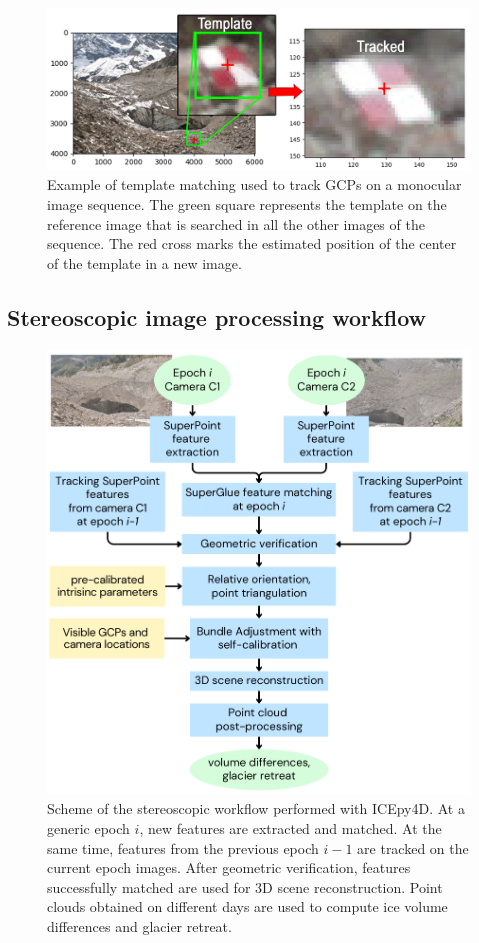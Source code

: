 \begin{figure}
    \centering
    \includegraphics[width=1\textwidth]{tracking_gcp.png}
    \caption{Example of template matching used to track GCPs on a
        monocular image sequence. The green square represents the
        template on the reference image that is searched in all the other
        images of the sequence.
        The red cross marks the estimated position of the center of the
        template in a new
        image.}
    \label{fig:4:templatematch}
\end{figure}

\subsection{Stereoscopic image processing workflow}\label{sec:4:stereoworkflow}

\begin{figure}
  \centering
  \includegraphics[width=.6\textwidth]{3_stereo-workflow.png}
  \caption{Scheme of the stereoscopic workflow performed with ICEpy4D. At a generic epoch
    \(i\), new features are extracted and matched.
    At the same time, features from the previous epoch \(i-1\) are tracked on the current
    epoch images. After geometric verification, features successfully
    matched are used for 3D scene reconstruction. Point clouds obtained on
    different days are used to compute ice volume differences and glacier
    retreat.}
  \label{fig:4:stereo-workflow}
\end{figure}

